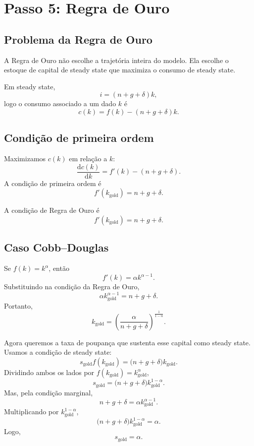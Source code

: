 \documentclass[11pt,a4paper]{article}
\newcommand{\dd}{\mathrm{d}}
\begin{document}
\section{Passo 5: Regra de Ouro}

\subsection{Problema da Regra de Ouro}

A Regra de Ouro n\~ao escolhe a trajet\'oria inteira do modelo. Ela escolhe o
estoque de capital de steady state que maximiza o consumo de steady state.

Em steady state,
\[
i=(n+g+\delta)k,
\]
logo o consumo associado a um dado \(k\) \'e
\[
c(k)=f(k)-(n+g+\delta)k.
\]

\subsection{Condi\c{c}\~ao de primeira ordem}

Maximizamos \(c(k)\) em rela\c{c}\~ao a \(k\):
\[
\frac{\dd c(k)}{\dd k}
=
f'(k)-(n+g+\delta).
\]
A condi\c{c}\~ao de primeira ordem \'e
\[
f'(k_{\text{gold}})=n+g+\delta.
\]

\begin{resultado}
A condi\c{c}\~ao de Regra de Ouro \'e
\[
f'(k_{\text{gold}})=n+g+\delta.
\]
\end{resultado}

\subsection{Caso Cobb--Douglas}

Se \(f(k)=k^\alpha\), ent\~ao
\[
f'(k)=\alpha k^{\alpha-1}.
\]
Substituindo na condi\c{c}\~ao da Regra de Ouro,
\[
\alpha k_{\text{gold}}^{\alpha-1}=n+g+\delta.
\]
Portanto,
\[
k_{\text{gold}}
=
\left(\frac{\alpha}{n+g+\delta}\right)^{\frac{1}{1-\alpha}}.
\]

Agora queremos a taxa de poupan\c{c}a que sustenta esse capital como steady
state. Usamos a condi\c{c}\~ao de steady state:
\[
s_{\text{gold}}f(k_{\text{gold}})
=
\bigl(n+g+\delta\bigr)k_{\text{gold}}.
\]
Dividindo ambos os lados por \(f(k_{\text{gold}})=k_{\text{gold}}^\alpha\),
\[
s_{\text{gold}}
=
\bigl(n+g+\delta\bigr)k_{\text{gold}}^{1-\alpha}.
\]
Mas, pela condi\c{c}\~ao marginal,
\[
n+g+\delta=\alpha k_{\text{gold}}^{\alpha-1}.
\]
Multiplicando por \(k_{\text{gold}}^{1-\alpha}\),
\[
\bigl(n+g+\delta\bigr)k_{\text{gold}}^{1-\alpha}
=
\alpha.
\]
Logo,
\[
s_{\text{gold}}=\alpha.
\]
\end{document}
